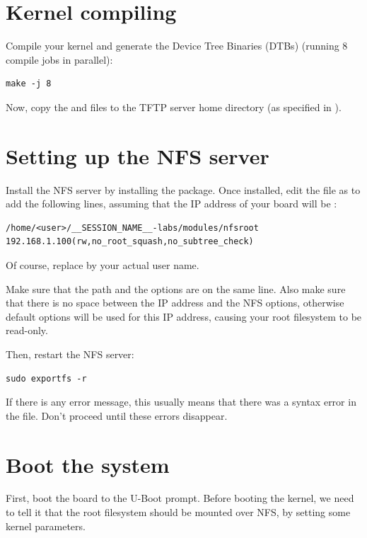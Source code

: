 \section{Kernel compiling}

Compile your kernel and generate the Device Tree Binaries (DTBs)
(running 8 compile jobs in parallel):

\begin{verbatim}
make -j 8
\end{verbatim}

Now, copy the  and  files to the
TFTP server home directory (as specified in ).

\section{Setting up the NFS server}

Install the NFS server by installing the 
package. Once installed, edit the  file as
 to add the following lines, assuming that the IP address
of your board will be :

\scriptsize
\begin{verbatim}
/home/<user>/__SESSION_NAME__-labs/modules/nfsroot 192.168.1.100(rw,no_root_squash,no_subtree_check)
\end{verbatim}
\normalsize

Of course, replace  by your actual user name.

Make sure that the path and the options are on the same line.
Also make sure that there is no space between the IP address and the NFS
options, otherwise default options will be used for this IP address,
causing your root filesystem to be read-only.

Then, restart the NFS server:

\begin{verbatim}
sudo exportfs -r
\end{verbatim}

If there is any error message, this usually means that there was a
syntax error in the  file. Don't proceed until these
errors disappear.

\section{Boot the system}

First, boot the board to the U-Boot prompt. Before booting the kernel,
we need to tell it that the root filesystem should be mounted over NFS,
by setting some kernel parameters.

